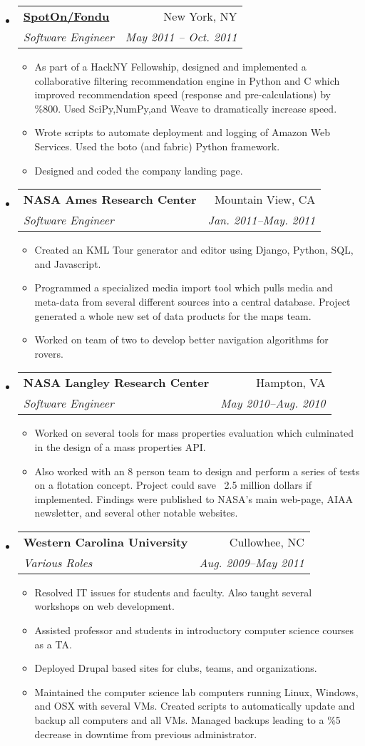 \documentclass[letterpaper,11pt]{article}
\makeatletter
\newcommand{\resitem}[1]{\item #1 \vspace{-2pt}}
\newcommand{\ressubheading}[4]{
\begin{tabular*}{7.0in}{l@{\extracolsep{\fill}}r}
		\textbf{#1} & #2 \\
		\textit{#3} & \textit{#4} \\
\end{tabular*}\vspace{-6pt}}
\makeatother
\begin{document}
\begin{itemize}
\item
	\ressubheading{\href{http://fondu.com/}{SpotOn/Fondu}}{New York, NY}{Software Engineer}{May 2011 -- Oct. 2011}
	\begin{itemize}
		\resitem{As part of a HackNY Fellowship, designed and implemented a collaborative filtering recommendation engine in Python and C which improved recommendation speed (response and pre-calculations) by \%800. Used SciPy,NumPy,and Weave to dramatically increase speed.}
		\resitem{Wrote scripts to automate deployment and logging of Amazon Web Services. Used the boto (and fabric) Python framework.}
		\resitem{Designed and coded the company landing page.}
	\end{itemize}
\item
   \ressubheading{NASA Ames Research Center}{Mountain View, CA}{Software Engineer}{Jan. 2011--May. 2011}
   \begin{itemize}
      \resitem{Created an KML Tour generator and editor using Django, Python, SQL, and Javascript.}
      \resitem{Programmed a specialized media import tool which pulls media and meta-data from several different sources into a central database. Project generated a whole new set of data products for the maps team.}
      \resitem{Worked on team of two to develop better navigation algorithms for rovers.}
   \end{itemize}
\item
   \ressubheading{NASA Langley Research Center}{Hampton, VA}{Software Engineer}{May 2010--Aug. 2010}
      \begin{itemize}
         \resitem{Worked on several tools for mass properties evaluation
         which culminated in the design of a mass properties API.} 
         \resitem{Also worked
         with an 8 person team to design and perform a series of tests on
         a flotation concept. Project could save ~2.5 million dollars if implemented.
         Findings were published to NASA's main web-page, AIAA
         newsletter, and several other notable websites.}
      \end{itemize}
\item
   \ressubheading{Western Carolina University}{Cullowhee, NC}{Various Roles}{Aug. 2009--May 2011}
      \begin{itemize}
         \resitem{Resolved IT issues for students and faculty. Also taught several workshops on web development.}
         \resitem{Assisted professor and students in introductory computer science courses as a TA.}
         \resitem{Deployed Drupal based sites for clubs, teams, and organizations.}
         \resitem{Maintained the computer science lab computers running Linux, Windows, and OSX with several VMs. Created scripts to automatically update and backup all computers and all VMs. Managed backups leading to a \%5 decrease in downtime from previous administrator.}
      \end{itemize}
\end{itemize}
\end{document}
